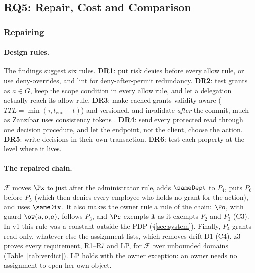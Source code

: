\subsection{RQ5: Repair, Cost and Comparison}
\label{sec:rq5}

\subsubsection{Repairing \sysname}

\paragraph{Design rules.} The findings suggest six rules.
\textbf{DR1}: put risk denies before every allow rule, or use deny-overrides, and lint for deny-after-permit
redundancy.
\textbf{DR2}: test grants as $a\in G$, keep the scope condition in every allow rule, and let a delegation
actually reach its allow rule.
\textbf{DR3}: make cached grants validity-aware ($\mathit{TTL}=\min(\tau,t_{\mathrm{end}}-t)$) and versioned, and
invalidate \emph{after} the commit, much as Zanzibar uses consistency tokens \cite{pang2019zanzibar}.
\textbf{DR4}: send every protected read through one decision procedure, and let the endpoint, not the client,
choose the action.
\textbf{DR5}: write decisions in their own transaction.
\textbf{DR6}: test each property at the level where it lives.

\paragraph{The repaired chain.} $\mathcal{F}$ moves $\Px$ to just after the administrator rule, adds $\sameDept$ to
$P_4$, puts $P_6$ before $P_5$ (which then denies every employee who holds no grant for the action), and uses
$\sameDiv$. It also makes the owner rule a rule of the chain: $\Po$, with guard $\ow(u,o,a)$, follows $P_3$, and
$\Pc$ exempts it as it exempts $P_2$ and $P_3$ (C3). In v1 this rule was a constant outside the PDP
(\S\ref{sec:system}). Finally, $P_4$ grants read only, whatever else the assignment lists, which removes drift D1
(C4). z3 proves every requirement, R1--R7 and LP, for $\mathcal{F}$ over unbounded domains
(Table~\ref{tab:verdict}). LP holds with the owner exception: an owner needs no assignment to open her own
object.

